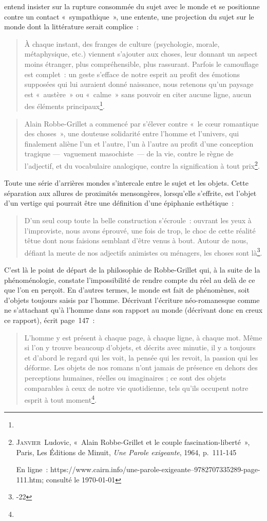 \documentclass[12pt, a4paper]{article}
\begin{document}
\punr{} entend insister sur la rupture consommée du sujet avec le monde et se positionne contre un contact «~sympathique~», une entente, une projection du sujet sur le monde dont la littérature serait complice~:
\begin{quote}
    À chaque instant, des franges de culture (psychologie, morale, métaphysique, etc.) viennent s’ajouter aux choses, leur donnant un aspect moins étranger, plus compréhensible, plus rassurant. Parfois le camouflage est complet~: un geste s’efface de notre esprit au profit des émotions supposées qui lui auraient donné naissance, nous retenons qu’un paysage est «~austère~» ou «~calme~» sans pouvoir en citer aucune ligne, aucun des éléments principaux\footnote{}.
\end{quote}

\begin{quote}
    Alain Robbe-Grillet a commencé par s’élever contre «~le cœur romantique des choses~», une douteuse solidarité entre l’homme et l’univers, qui finalement aliène l’un et l’autre, l’un à l’autre au profit d’une conception tragique —~vaguement masochiste~— de la vie, contre le règne de l’adjectif, et du vocabulaire analogique, contre la signification à tout prix\footnote{\textsc{Janvier}~Ludovic, «~Alain Robbe-Grillet et le couple fascination-liberté~», Paris, Les Éditions de Minuit, \textit{Une Parole exigeante}, 1964, p.~111-145

En ligne~: https://www.cairn.info/une-parole-exigeante--9782707335289-page-111.htm; consulté le \today}.
\end{quote}

Toute une série d'arrières mondes s'intercale entre le sujet et les objets. Cette séparation aux allures de proximités mensongères, lorsqu'elle s'effrite, est l'objet d'un vertige qui pourrait être une définition d'une épiphanie esthétique~:
\begin{quote}
    D’un seul coup toute la belle construction s’écroule~: ouvrant les yeux à l’improviste, nous avons éprouvé, une fois de trop, le choc de cette réalité têtue dont nous faisions semblant d’être venus à bout. Autour de nous, défiant la meute de nos adjectifs animistes ou ménagers, les choses sont là\footnote{-22}. 
\end{quote}
C'est là le point de départ de la philosophie de Robbe-Grillet qui, à la suite de la phénoménologie, constate l'impossibilité de rendre compte du réel au delà de ce que l'on en perçoit. En d'autres termes, le monde est fait de phénomènes, soit d'objets toujours saisis par l'homme. Décrivant l'écriture néo-romanesque comme ne s'attachant qu'à l'homme dans son rapport au monde (décrivant donc en creux ce rapport), \robbe{} écrit page~147~:
\begin{quote}
    L’homme y est présent à chaque page, à chaque ligne, à chaque mot. Même si l’on y trouve beaucoup d’objets, et décrits avec minutie, il y a toujours et d’abord le regard qui les voit, la pensée qui les revoit, la passion qui les déforme. Les objets de nos romans n’ont jamais de présence en dehors des perceptions humaines, réelles ou imaginaires ; ce sont des objets comparables à ceux de notre vie quotidienne, tels qu’ils occupent notre esprit à tout moment\footnote{}.
\end{quote}
\end{document}
